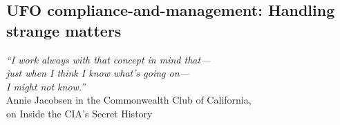 %
%
%

\begin{partbacktext}
\part{UFO compliance-and-management: Handling strange matters}
\noindent

\begin{flushright}
{\em ``I work always with that concept  in mind that---\\
just when I think I know what's going   on---\\
I might not know.''}  \\
Annie Jacobsen in the Commonwealth Club of California,\\
on Inside the CIA's Secret History\cite[time = 39:17]{Jacobsen2019May}
\end{flushright}


\end{partbacktext}
